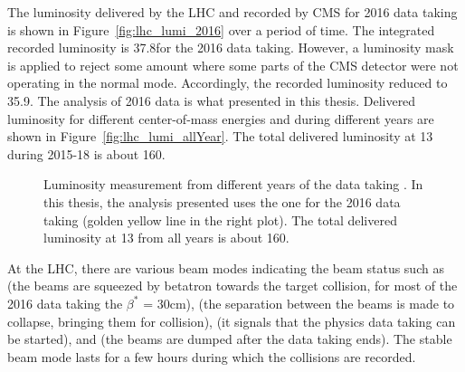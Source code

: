 \begin{itemize}[leftmargin=*]
	The luminosity delivered by the LHC and recorded by CMS for 2016 data taking is shown 
	in Figure~\ref{fig:lhc_lumi_2016} over a period of time. The integrated 
	recorded luminosity is 37.8\fbinv for the 2016 data taking. However, a luminosity
	mask is applied to reject some amount where some parts of the CMS detector 
	were not operating in the normal mode. Accordingly, the recorded
	luminosity reduced to 35.9\fbinv. The analysis of 2016 data is what presented in this thesis.
	Delivered luminosity for different center-of-mass energies and during different years
	are shown in Figure~\ref{fig:lhc_lumi_allYear}. The total delivered luminosity at
	13 \TeV during 2015-18 is about 160\fbinv.
	\begin{figure}
       	\centering
      	\hfil
	\caption{Luminosity measurement from different years of the data taking \cite{CMSLumi}. 
		In this thesis, the analysis presented uses the one for the 2016 data taking
		(golden yellow line in the right plot). The total delivered luminosity at 13 \TeV 
		from all years is about 160\fbinv.}
      	\label{fig:lhc_lumi}
     	\end{figure}
\end{itemize}
At the LHC, there are various beam modes indicating the beam status such as 
 (the beams are squeezed by betatron towards the target collision, for most of
the 2016 data taking the $\beta^*$ = 30\unit{cm}),  (the separation between the beams
is made to collapse, bringing them for collision),  (it signals that
the physics data taking can be started), and  (the beams are dumped after the data
taking ends). The stable beam mode lasts for a few hours during which the collisions are recorded.


